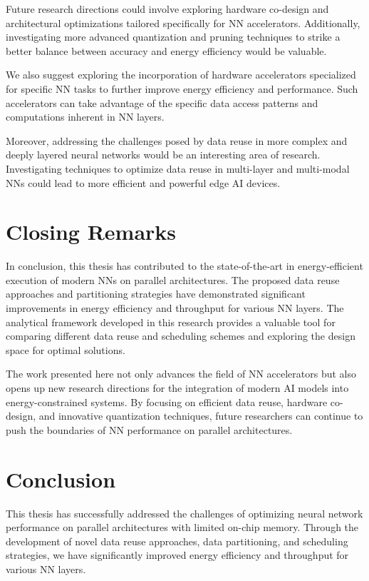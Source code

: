 Future research directions could involve exploring hardware co-design and architectural optimizations tailored specifically for NN accelerators. Additionally, investigating more advanced quantization and pruning techniques to strike a better balance between accuracy and energy efficiency would be valuable.

We also suggest exploring the incorporation of hardware accelerators specialized for specific NN tasks to further improve energy efficiency and performance. Such accelerators can take advantage of the specific data access patterns and computations inherent in NN layers.

Moreover, addressing the challenges posed by data reuse in more complex and deeply layered neural networks would be an interesting area of research. Investigating techniques to optimize data reuse in multi-layer and multi-modal NNs could lead to more efficient and powerful edge AI devices.
\section{Closing Remarks}
In conclusion, this thesis has contributed to the state-of-the-art in energy-efficient execution of modern NNs on parallel architectures. The proposed data reuse approaches and partitioning strategies have demonstrated significant improvements in energy efficiency and throughput for various NN layers. The analytical framework developed in this research provides a valuable tool for comparing different data reuse and scheduling schemes and exploring the design space for optimal solutions.

The work presented here not only advances the field of NN accelerators but also opens up new research directions for the integration of modern AI models into energy-constrained systems. By focusing on efficient data reuse, hardware co-design, and innovative quantization techniques, future researchers can continue to push the boundaries of NN performance on parallel architectures.
\section{Conclusion}
This thesis has successfully addressed the challenges of optimizing neural network performance on parallel architectures with limited on-chip memory. Through the development of novel data reuse approaches, data partitioning, and scheduling strategies, we have significantly improved energy efficiency and throughput for various NN layers.

